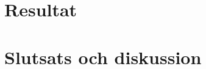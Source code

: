 \documentclass[a4paper]{article}
\begin{document}






\newpage
\section{Resultat}






\newpage
\section{Slutsats och diskussion}



\newpage


\end{document}
